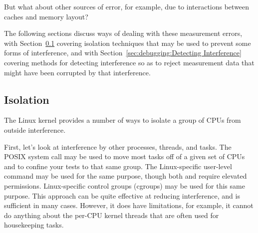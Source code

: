 \QuickQuiz{}
	But what about other sources of error, for example, due to
	interactions between caches and memory layout?
 \QuickQuizEnd

The following sections discuss ways of dealing with these measurement
errors, with
Section~\ref{sec:debugging:Isolation}
covering isolation techniques that may be used to prevent some forms of
interference,
and with
Section~\ref{sec:debugging:Detecting Interference}
covering methods for detecting interference so as to reject measurement
data that might have been corrupted by that interference.

\subsection{Isolation}
\label{sec:debugging:Isolation}

The Linux kernel provides a number of ways to isolate a group of
CPUs from outside interference.

First, let's look at interference by other processes, threads, and tasks.
The POSIX  system call may be used to move
most tasks off of a given set of CPUs and to confine your tests to
that same group.
The Linux-specific user-level  command may be used for
the same purpose, though both  and
 require elevated permissions.
Linux-specific control groups (cgroups) may be used for this same purpose.
This approach can be quite effective at reducing interference, and
is sufficient in many cases.
However, it does have limitations, for example, it cannot do anything
about the per-CPU kernel threads that are often used for housekeeping
tasks.


